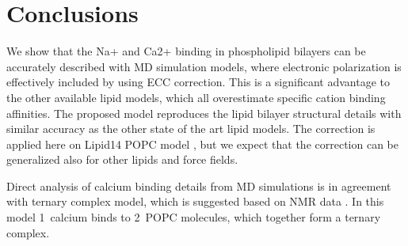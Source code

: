 \documentclass[aip,jcp,twocolumn]{revtex4}
\begin{document}



\section{Conclusions}
We show that the Na+ and Ca2+ binding in phospholipid bilayers can
be accurately described with MD simulation models, where electronic
polarization is effectively included by using ECC correction.
This is a significant advantage to the other available lipid models,
which all overestimate specific cation binding affinities.  
The proposed model reproduces the lipid bilayer structural details
with similar accuracy as the other state of the art lipid models.
The correction is applied here on Lipid14 POPC model \cite{dickson14},
but we expect that the correction can be generalized also for other lipids
and force fields.

Direct analysis of calcium binding details from MD simulations is in agreement
with ternary complex model, which is suggested based on NMR data \cite{altenbach84}.
In this model 1~calcium binds to 2~POPC molecules, which together form a ternary
complex.
\end{document}
